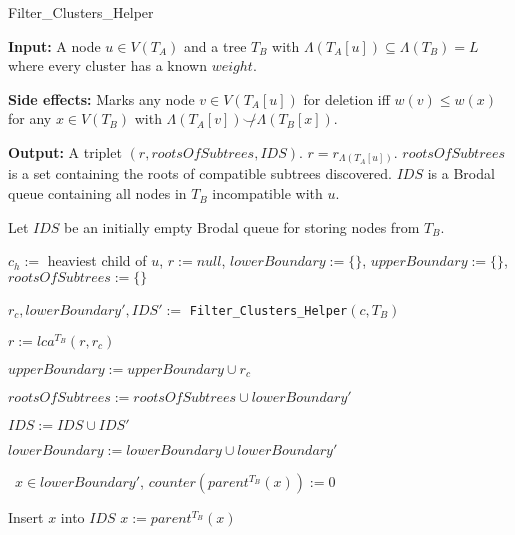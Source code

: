 \documentclass{article}
\newcommand{\compatible}{\smile}
\newcommand{\leafset}{\Lambda}
\begin{document}
    \begin{algorithm}
        \caption{Filter\_Clusters\_Helper}
        \label{alg:filterclustershelper}

        \begin{algorithmic}[1]
            \State \textbf{Input:} A node $u \in V(T_A)$ and a tree $T_B$ with $\leafset(T_A[u]) \subseteq \leafset(T_B) = L$ where every cluster has a known $weight$.

            \State \textbf{Side effects:} Marks any node $v \in V(T_A[u])$ for deletion iff $w(v) \leq w(x)$ for any $x \in V(T_B)$ with $\leafset(T_A[v]) \not\compatible \leafset(T_B[x])$.

            \State \textbf{Output:} A triplet $(r, rootsOfSubtrees, IDS)$. $r = r_{\leafset(T_A[u])}$. $rootsOfSubtrees$ is a set containing the roots of compatible subtrees discovered. $IDS$ is a Brodal queue containing all nodes in $T_B$ incompatible with $u$.

            \State Let $IDS$ be an initially empty Brodal queue for storing nodes from $T_B$.

            \State $c_h :=$ heaviest child of $u$, $r := null$, $lowerBoundary := \{\}$, $upperBoundary := \{\}$, $rootsOfSubtrees := \{\}$

                \State $r_c, lowerBoundary', IDS' :=$ \texttt{Filter\_Clusters\_Helper}$(c, T_B)$

                \State $r := lca^{T_B}(r, r_c)$

                \State $upperBoundary := upperBoundary \cup r_c$

                \State $rootsOfSubtrees := rootsOfSubtrees \cup lowerBoundary'$

                \State $IDS := IDS \cup IDS'$

                    \State $lowerBoundary := lowerBoundary \cup lowerBoundary'$

                    \State \algorithmicforall\ $x \in lowerBoundary'$, $counter(parent^{T_B}(x)) := 0$
                \EndIf
            \EndFor

                    \State Insert $x$ into $IDS$
                    \State $x := parent^{T_B}(x)$
                \EndWhile
            \EndFor


\end{algorithmic}
\end{algorithm}
\end{document}
